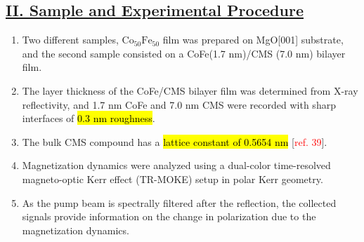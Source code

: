 \subsection*{\underline{II. Sample and Experimental Procedure}}
\begin{enumerate}
    \item Two different samples, $\mathrm{Co_{50}Fe_{50}}$ film was prepared on MgO[001] substrate, and the second sample consisted on a CoFe(1.7 nm)/CMS (7.0 nm) bilayer film.
    \item The layer thickness of the CoFe/CMS bilayer film was determined from X-ray reflectivity, and 1.7 nm CoFe and 7.0 nm CMS were recorded with sharp interfaces of \hl{0.3 nm roughness}.
    \item The bulk CMS compound has a \hl{lattice constant of 0.5654 nm} [\textcolor{red}{ref. 39}].
    \item Magnetization dynamics were analyzed using a dual-color time-resolved magneto-optic Kerr effect (TR-MOKE) setup in polar Kerr geometry.
    \item As the pump beam is spectrally filtered after the reflection, the collected signals provide information on the change in polarization due to the magnetization dynamics.
\end{enumerate}
